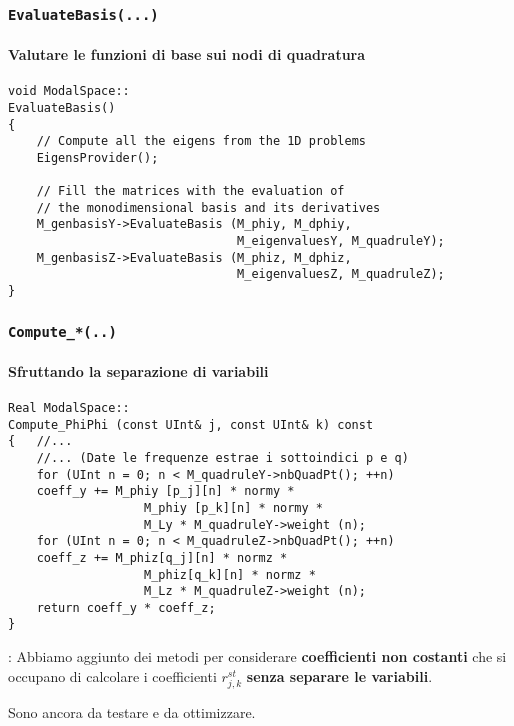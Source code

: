 \begin{frame}[fragile]
\frametitle{\texttt{EvaluateBasis(...)}}
\framesubtitle{Valutare le funzioni di base sui nodi di quadratura}
\begin{lstlisting}[style=general]
void ModalSpace::
EvaluateBasis()
{
    // Compute all the eigens from the 1D problems
    EigensProvider();
    
    // Fill the matrices with the evaluation of 
    // the monodimensional basis and its derivatives
    M_genbasisY->EvaluateBasis (M_phiy, M_dphiy, 
                                M_eigenvaluesY, M_quadruleY);
    M_genbasisZ->EvaluateBasis (M_phiz, M_dphiz, 
                                M_eigenvaluesZ, M_quadruleZ);
}
\end{lstlisting}
\end{frame}
\begin{frame}[fragile]
 \frametitle{\texttt{Compute\_*(..)}}
 \framesubtitle{Sfruttando la separazione di variabili}
 \begin{lstlisting}[style=general]
Real ModalSpace::
Compute_PhiPhi (const UInt& j, const UInt& k) const
{   //... 
    //... (Date le frequenze estrae i sottoindici p e q)
    for (UInt n = 0; n < M_quadruleY->nbQuadPt(); ++n)
    coeff_y += M_phiy [p_j][n] * normy *
                   M_phiy [p_k][n] * normy *
                   M_Ly * M_quadruleY->weight (n);
    for (UInt n = 0; n < M_quadruleZ->nbQuadPt(); ++n)
    coeff_z += M_phiz[q_j][n] * normz *
                   M_phiz[q_k][n] * normz *
                   M_Lz * M_quadruleZ->weight (n);
    return coeff_y * coeff_z;
}
\end{lstlisting}

{\footnotesize\textbf{}: Abbiamo aggiunto dei metodi per considerare 
\textbf{coefficienti non costanti} che si occupano di calcolare i coefficienti $r^{st}_{j,k}$ \textbf{senza separare le variabili}.

Sono ancora da testare e da ottimizzare.}
\end{frame}

